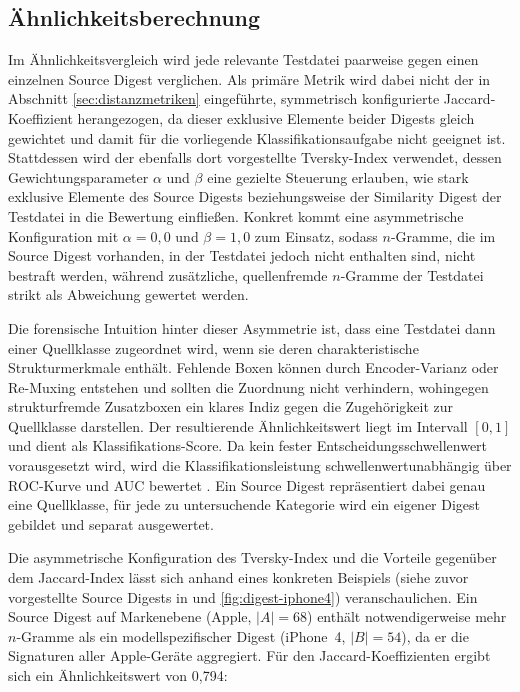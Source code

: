%

\subsection{Ähnlichkeitsberechnung}
\label{sec:aehnlichkeitsberechnung}

Im Ähnlichkeitsvergleich wird jede relevante Testdatei paarweise gegen einen einzelnen Source Digest verglichen. Als primäre Metrik wird dabei nicht der in Abschnitt \ref{sec:distanzmetriken} eingeführte, symmetrisch konfigurierte Jaccard-Koeffizient herangezogen, da dieser exklusive Elemente beider Digests gleich gewichtet und damit für die vorliegende Klassifikationsaufgabe nicht geeignet ist. Stattdessen wird der ebenfalls dort vorgestellte Tversky-Index verwendet, dessen Gewichtungsparameter \(\alpha\) und \(\beta\) eine gezielte Steuerung erlauben, wie stark exklusive Elemente des Source Digests beziehungsweise der Similarity Digest der Testdatei in die Bewertung einfließen. Konkret kommt eine asymmetrische Konfiguration mit \(\alpha = 0{,}0\) und \(\beta = 1{,}0\) zum Einsatz, sodass \(n\)-Gramme, die im Source Digest vorhanden, in der Testdatei jedoch nicht enthalten sind, nicht bestraft werden, während zusätzliche, quellenfremde \(n\)-Gramme der Testdatei strikt als Abweichung gewertet werden.

Die forensische Intuition hinter dieser Asymmetrie ist, dass eine Testdatei dann einer Quellklasse zugeordnet wird, wenn sie deren charakteristische Strukturmerkmale enthält. Fehlende Boxen können durch Encoder-Varianz oder Re-Muxing entstehen und sollten die Zuordnung nicht verhindern, wohingegen strukturfremde Zusatzboxen ein klares Indiz gegen die Zugehörigkeit zur Quellklasse darstellen. Der resultierende Ähnlichkeitswert liegt im Intervall \([0, 1]\) und dient als Klassifikations-Score. Da kein fester Entscheidungsschwellenwert vorausgesetzt wird, wird die Klassifikationsleistung schwellenwertunabhängig über ROC-Kurve und AUC bewertet \cite{fawcett_introduction_2006}. Ein Source Digest repräsentiert dabei genau eine Quellklasse, für jede zu untersuchende Kategorie wird ein eigener Digest gebildet und separat ausgewertet.

Die asymmetrische Konfiguration des Tversky-Index und die Vorteile gegenüber dem Jaccard-Index lässt sich anhand eines konkreten Beispiels (siehe zuvor vorgestellte Source Digests in  und \ref{fig:digest-iphone4}) veranschaulichen. Ein Source Digest auf Markenebene (Apple, $|A| = 68$) enthält notwendigerweise mehr \(n\)-Gramme als ein modellspezifischer Digest (iPhone~4, $|B| = 54$), da er die Signaturen aller Apple-Geräte aggregiert. Für den Jaccard-Koeffizienten ergibt sich ein Ähnlichkeitswert von 0{,}794:

